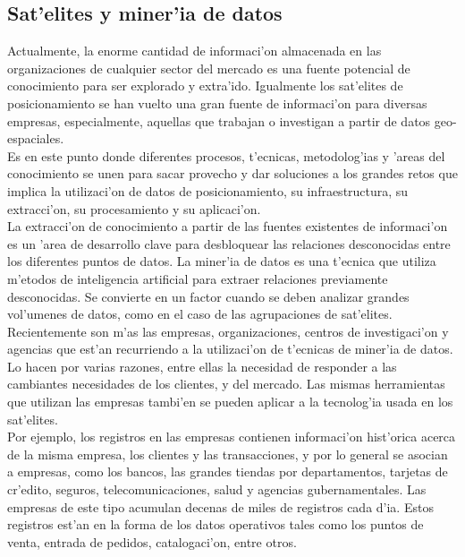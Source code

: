 \subsection{Sat'elites y miner'ia de datos}
\noindent
Actualmente, la enorme cantidad de informaci'on almacenada en las organizaciones de cualquier sector del mercado es una fuente potencial de conocimiento para ser explorado y extra'ido. Igualmente los sat'elites de posicionamiento se han vuelto una gran fuente de informaci'on para diversas empresas, especialmente, aquellas que trabajan o investigan a partir de datos geo-espaciales.\\

Es en este punto donde diferentes procesos, t'ecnicas, metodolog'ias y 'areas del conocimiento se unen para sacar provecho y dar soluciones a los grandes retos que implica la utilizaci'on de datos de posicionamiento, su infraestructura, su extracci'on, su procesamiento y su aplicaci'on.\\

La extracci'on de conocimiento a partir de las fuentes existentes de informaci'on es un 'area de desarrollo clave para desbloquear las relaciones desconocidas entre los diferentes puntos de datos. La miner'ia de datos es una t'ecnica que utiliza m'etodos de inteligencia artificial para extraer relaciones previamente desconocidas. Se convierte en un factor cuando se deben analizar grandes vol'umenes de datos, como en el caso de las agrupaciones de sat'elites.\\

Recientemente son m'as las empresas, organizaciones, centros de investigaci'on y agencias que est'an recurriendo a la utilizaci'on de t'ecnicas de miner'ia de datos. Lo hacen por varias razones, entre ellas la necesidad de responder a las cambiantes necesidades de los clientes, y del mercado. Las mismas herramientas que utilizan las empresas tambi'en se pueden aplicar a la tecnolog'ia usada en los  sat'elites.\\

Por ejemplo, los registros en las empresas contienen informaci'on hist'orica acerca de la misma empresa, los clientes y las transacciones, y por lo general se asocian a empresas, como los bancos, las grandes tiendas por departamentos, tarjetas de cr'edito, seguros, telecomunicaciones, salud y agencias gubernamentales. Las empresas de este tipo acumulan decenas de miles de registros cada d'ia. Estos registros est'an en la forma de los datos operativos tales como los puntos de venta, entrada de pedidos, catalogaci'on, entre otros.\\

